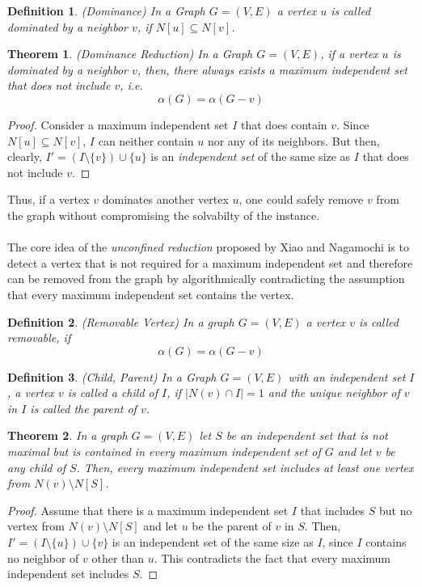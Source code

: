 \documentclass[]{article}
\newtheorem{theorem}{Theorem}
\newtheorem{definition}{Definition}
\begin{document}
\begin{definition} (Dominance)
	In a Graph $G=(V,E)$ a vertex $u$ is called dominated by a neighbor $v$, if $N[u]\subseteq N[v]$.
\end{definition}


\begin{theorem} (Dominance Reduction) In a Graph $G=(V,E)$, if a vertex $u$ is dominated by a neighbor $v$, then, there always exists a maximum independent set that does not include $v$, i.e.\[\alpha(G)=\alpha(G-v)\]
\end{theorem}
\begin{proof}
Consider a maximum independent set $I$ that does contain $v$. Since $N[u]\subseteq N[v]$, $I$ can neither contain $u$ nor any of its neighbors. But then, clearly, $I' = (I\setminus\{v\})\cup\{u\}$ is an \textit{independent set} of the same size as $I$ that does not include $v$.
\end{proof}
Thus, if a vertex $v$ dominates another vertex $u$, one could safely remove $v$ from the graph without compromising the solvabilty of the instance.\paragraph{}
The core idea of the \textit{unconfined reduction} proposed by Xiao and Nagamochi \cite{XiaoNagamochi} is to detect a vertex that is not required for a maximum independent set and therefore can be removed from the graph by algorithmically contradicting the assumption that every maximum independent set contains the vertex.
\begin{definition} (Removable Vertex)
	In a graph $G=(V,E)$ a vertex $v$ is called removable, if 
	\[\alpha(G) = \alpha(G-v)\]
\end{definition}

\begin{definition} (Child, Parent) In a Graph $G=(V,E)$ with an \textit{independent set} $I$, a vertex $v$ is called a child of $I$, if $|N(v)\cap I| = 1$ and the unique neighbor of $v$ in $I$ is called the parent of $v$.
\end{definition}

\begin{theorem} \label{unconfined}
	In a graph $G=(V,E)$ let $S$ be an independent set that is not maximal but is contained in every maximum independent set of $G$ and let $v$ be any child of $S$. Then, every maximum independent set includes at least one vertex from $N(v)\setminus N[S]$.
\end{theorem}
\begin{proof}
	Assume that there is a maximum independent set $I$ that includes $S$ but no vertex from $N(v)\setminus N[S]$ and let $u$ be the parent of $v$ in $S$. Then, $I'=(I\setminus\{u\})\cup\{v\}$ is an independent set of the same size as $I$, since $I$ contains no neighbor of $v$ other than $u$. This contradicts the fact that every maximum independent set includes $S$.
\end{proof}
\end{document}
